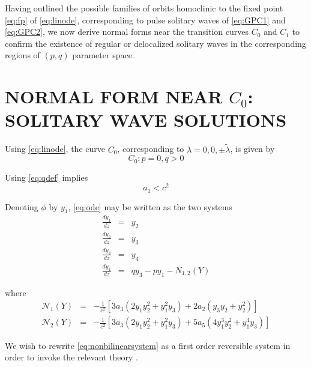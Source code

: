 Having outlined the possible families of orbits homoclinic to the fixed point \eqref{eq:fp} of \eqref{eq:linode},
corresponding to pulse solitary waves of \eqref{eq:GPC1} and \eqref{eq:GPC2}, we now derive normal forms near the transition curves $C_0$ and $C_1$
to confirm the existence of regular or delocalized solitary waves in the corresponding regions of $\left(p,q\right)$ parameter space.


\section{NORMAL FORM NEAR $C_0$: SOLITARY WAVE SOLUTIONS}

Using \eqref{eq:linode}, the curve $C_0$, corresponding to $\lambda = 0,0,\pm \tilde{ \lambda } $, is given by
\begin{equation}
C_0: { p=0, q > 0 }
\end{equation}

Using \eqref{eq:qdef} implies
\begin{equation}
a_1 < c^2 
\end{equation}

Denoting $\phi$ by $y_1$, \eqref{eq:ode} may be written as the two systems
\begin{subequations}\label{eq:nonbilinearsystem}
\begin{eqnarray}
\frac{d y_1 }{d z} &=& y_2 \\
\frac{d y_2 }{d z} &=& y_3 \\
\frac{d y_3 }{d z} &=& y_4 \\
\frac{d y_4 }{d z} &=& q y_3 - p y_1 - N_{1,2}(Y)
\end{eqnarray}
\end{subequations}

where
\begin{subequations}
\begin{eqnarray}
\mathcal{N}_1\left(Y\right) &=& - \frac{1}{c^2}\left[  3 a_3 \left( 2 y_1 y_2^2 + y_1^2 y_3 \right) + 2 a_2\left( y_3 y_2 + y_2^2\right) \right] \\
\mathcal{N}_2\left(Y\right) &=& - \frac{1}{c^2}\left[ 3 a_3 \left( 2 y_1 y_2^2 + y_1^2 y_3\right) + 5 a_5 \left( 4 y_1^3 y_2^2 + y_1^4 y_3 \right) \right]
\end{eqnarray}
\end{subequations}

We wish to rewrite \eqref{eq:nonbilinearsystem} as a first order reversible system in order to invoke the relevant theory \cite{IA}. 


